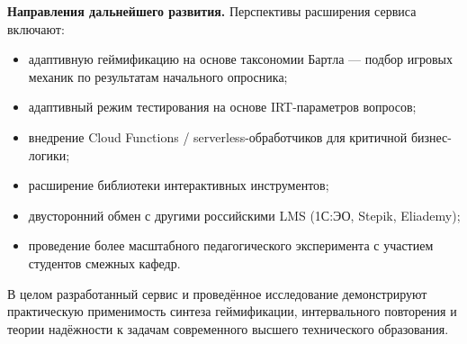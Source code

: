 \textbf{Направления дальнейшего развития.}
Перспективы расширения сервиса включают:
\begin{itemize}[noitemsep]
    \item адаптивную геймификацию на основе таксономии Бартла ---
          подбор игровых механик по результатам начального опросника;
    \item адаптивный режим тестирования на основе IRT-параметров
          вопросов;
    \item внедрение Cloud Functions / serverless-обработчиков
          для критичной бизнес-логики;
    \item расширение библиотеки интерактивных инструментов;
    \item двусторонний обмен с другими российскими LMS
          (1С:ЭО, Stepik, Eliademy);
    \item проведение более масштабного педагогического эксперимента
          с участием студентов смежных кафедр.
\end{itemize}

В целом разработанный сервис и проведённое исследование
демонстрируют практическую применимость синтеза геймификации,
интервального повторения и теории надёжности к задачам
современного высшего технического образования.

\newpage
